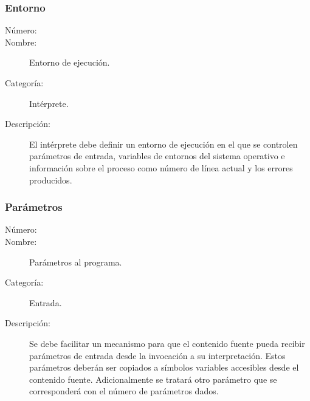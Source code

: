 \subsubsection{Entorno}
	\begin{description}
		\item [Número:] \cn
		\item [Nombre:] Entorno de ejecución.
		\item [Categoría:] Intérprete.
		\item [Descripción:] El intérprete debe definir un entorno de ejecución en
		el que se controlen parámetros de entrada, variables de entornos del sistema operativo e información sobre
		el proceso como número de línea actual y los errores producidos.
	\end {description}

\subsubsection {Parámetros}
	\begin{description}
		\item [Número:] \cn
		\item [Nombre:] Parámetros al programa.
		\item [Categoría:] Entrada.
		\item [Descripción:] Se debe facilitar un mecanismo para que el contenido fuente pueda recibir parámetros de entrada desde la
		invocación a su interpretación. Estos parámetros deberán ser copiados a símbolos variables accesibles desde el contenido fuente. 
		Adicionalmente se tratará otro parámetro que se corresponderá con el número de parámetros dados.
	\end{description}
